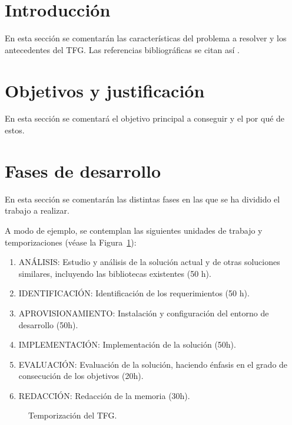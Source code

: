 \documentclass[titlepage, 12pt, a4paper, oneside]{article}
\begin{document}
\normalsize

\section{Introducción}
En esta sección se comentarán las características del problema a resolver y los antecedentes del TFG. Las referencias bibliográficas se citan así \cite{einstein1922kosmologische}.

\section{Objetivos y justificación}
En esta sección se comentará el objetivo principal a conseguir y el por qué de estos.

\section{Fases de desarrollo}
En esta sección se comentarán las distintas fases en las que se ha
dividido el trabajo a realizar.

A modo de ejemplo, se contemplan las siguientes unidades de trabajo y
temporizaciones (véase la Figura~\ref{fig:temporizacion}):
\begin{enumerate}
  \item {ANÁLISIS:} Estudio y análisis de la solución actual y de
    otras soluciones similares, incluyendo las bibliotecas existentes
    (50 h).
  \item {IDENTIFICACIÓN}: Identificación de los requerimientos (50 h).
  \item {APROVISIONAMIENTO}: Instalación y configuración del entorno
    de desarrollo (50h).
  \item {IMPLEMENTACIÓN}: Implementación de la solución (50h).
  \item {EVALUACIÓN}: Evaluación de la solución, haciendo énfasis en
    el grado de consecución de los objetivos (20h).
  \item {REDACCIÓN}: Redacción de la memoria (30h).
\end{enumerate}

\begin{figure}
  \begin{center}
  \end{center}
  \caption{Temporización del TFG.\label{fig:temporizacion}}
\end{figure}
\end{document}
